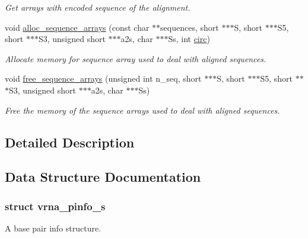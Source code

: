 \begin{DoxyCompactItemize}
\begin{DoxyCompactList}\small\item\em Get arrays with encoded sequence of the alignment. \end{DoxyCompactList}\item 
void \hyperlink{group__aln__utils_ga8a560930f7f2582cc3967723a86cfdfa}{alloc\+\_\+sequence\+\_\+arrays} (const char $\ast$$\ast$sequences, short $\ast$$\ast$$\ast$S, short $\ast$$\ast$$\ast$S5, short $\ast$$\ast$$\ast$S3, unsigned short $\ast$$\ast$$\ast$a2s, char $\ast$$\ast$$\ast$Ss, int \hyperlink{group__model__details_gaf9202a1a09f5828dc731e2d9a10fa111}{circ})
\begin{DoxyCompactList}\small\item\em Allocate memory for sequence array used to deal with aligned sequences. \end{DoxyCompactList}\item 
void \hyperlink{group__aln__utils_ga298a420a8c879202e2617b3f724fde38}{free\+\_\+sequence\+\_\+arrays} (unsigned int n\+\_\+seq, short $\ast$$\ast$$\ast$S, short $\ast$$\ast$$\ast$S5, short $\ast$$\ast$$\ast$S3, unsigned short $\ast$$\ast$$\ast$a2s, char $\ast$$\ast$$\ast$Ss)
\begin{DoxyCompactList}\small\item\em Free the memory of the sequence arrays used to deal with aligned sequences. \end{DoxyCompactList}\end{DoxyCompactItemize}


\subsection{Detailed Description}


\subsection{Data Structure Documentation}
\label{structvrna__pinfo__s}
\subsubsection{struct vrna\+\_\+pinfo\+\_\+s}
A base pair info structure. 


